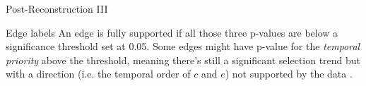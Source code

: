 \documentclass{beamer}
\begin{document}
\begin{frame}{Post-Reconstruction III}
{\begin{block}{Edge labels}
      An edge is fully supported if all those three p-values are below a
      significance threshold set at 0.05. Some edges might have p-value for the
      \textit{temporal priority} above the threshold, meaning there's still a
      significant selection trend but with a direction (i.e. the temporal order
      of $c$ and $e$) not supported by the data \cite{picnic}. 
    \end{block}
  }
\end{frame}
\end{document}
